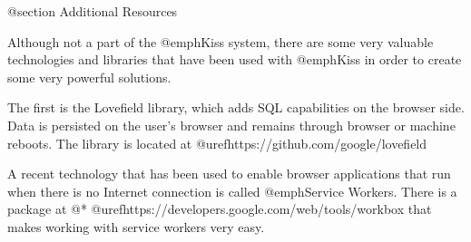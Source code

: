 @section Additional Resources

Although not a part of the @emph{Kiss} system, there are some very
valuable technologies and libraries that have been used with
@emph{Kiss} in order to create some very powerful solutions.

The first is the Lovefield library, which adds SQL capabilities on the
browser side.  Data is persisted on the user's browser and remains
through browser or machine reboots.  The library is located at
@uref{https://github.com/google/lovefield}

A recent technology that has been used to enable browser applications
that run when there is no Internet connection is called @emph{Service
Workers}.  There is a package at @*
@uref{https://developers.google.com/web/tools/workbox} that makes
working with service workers very easy.



